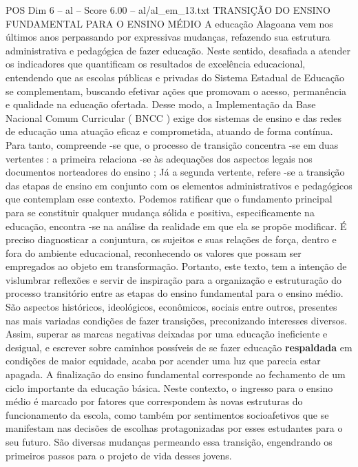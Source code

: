 \begin{textsample}{POS Dim 6 – al – Score 6.00 – al/al\_em\_13.txt}  \label{ex:f6_pos_230}
TRANSIÇÃO DO ENSINO FUNDAMENTAL PARA O ENSINO MÉDIO A educação Alagoana vem nos últimos anos perpassando por expressivas mudanças, refazendo sua estrutura administrativa e pedagógica de fazer educação.
Neste sentido, desafiada a atender os indicadores que quantificam os resultados de excelência educacional, entendendo que as escolas públicas e privadas do Sistema Estadual de Educação se complementam, buscando efetivar ações que promovam o acesso, permanência e qualidade na educação ofertada.
Desse modo, a Implementação da Base Nacional Comum Curricular ( BNCC ) exige dos sistemas de ensino e das redes de educação uma atuação eficaz e comprometida, atuando de forma contínua.
Para tanto, compreende -se que, o processo de transição concentra -se em duas vertentes : a primeira relaciona -se às adequações dos aspectos legais nos documentos norteadores do ensino ; Já a segunda vertente, refere -se a transição das etapas de ensino em conjunto com os elementos administrativos e pedagógicos que contemplam esse contexto.
Podemos ratificar que o fundamento principal para se constituir qualquer mudança sólida e positiva, especificamente na educação, encontra -se na análise da realidade em que ela se propõe modificar.
É preciso diagnosticar a conjuntura, os sujeitos e suas relações de força, dentro e fora do ambiente educacional, reconhecendo os valores que possam ser empregados ao objeto em transformação.
Portanto, este texto, tem a intenção de vislumbrar reflexões e servir de inspiração para a organização e estruturação do processo transitório entre as etapas do ensino fundamental para o ensino médio.
São aspectos históricos, ideológicos, econômicos, sociais entre outros, presentes nas mais variadas condições de fazer transições, preconizando interesses diversos.
Assim, superar as marcas negativas deixadas por uma educação ineficiente e desigual, e escrever sobre caminhos possíveis de se fazer educação \textbf{respaldada} em condições de maior equidade, acaba por acender uma luz que parecia estar apagada.
A finalização do ensino fundamental corresponde ao fechamento de um ciclo importante da educação básica.
Neste contexto, o ingresso para o ensino médio é marcado por fatores que correspondem às novas estruturas do funcionamento da escola, como também por sentimentos socioafetivos que se manifestam nas decisões de escolhas protagonizadas por esses estudantes para o seu futuro.
São diversas mudanças permeando essa transição, engendrando os primeiros passos para o projeto de vida desses jovens.

\end{textsample}
